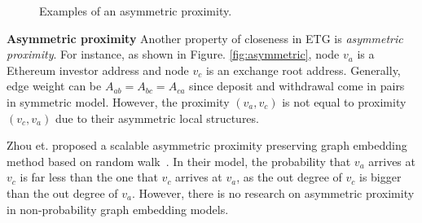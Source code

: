 \begin{figure}[htbp]
	\centering
	\caption{Examples of an asymmetric proximity.}

\end{figure}

\textbf{Asymmetric proximity}
Another property of closeness in ETG is \emph{asymmetric proximity}. For instance, as shown in Figure. \ref{fig:asymmetric}, node $v_a$ is a Ethereum investor address and node $v_c$ is an exchange root address. Generally, edge weight can be $A_{ab}=A_{bc}=A_{ca}$ since deposit and withdrawal come in pairs in symmetric model. However, the proximity $(v_a,v_c)$ is not equal to proximity $(v_c,v_a)$ due to their asymmetric local structures.

 Zhou et. proposed a scalable asymmetric proximity preserving graph embedding method based on random walk~\cite{zhou2017scalable}. In their model, the probability that $v_a$ arrives at $v_c$ is far less than the one that $v_c$ arrives at $v_a$, as the out degree of $v_c$ is bigger than the out degree of $v_a$. 
However, there is no research on asymmetric proximity in non-probability graph embedding models.

 



